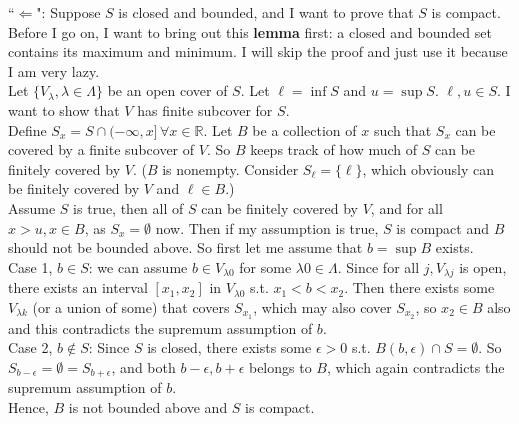 \documentclass[11pt,letterpaper]{article}
\begin{document}
\noindent ``\underline{$\Leftarrow$}": Suppose $S$ is closed and bounded, and I want to prove that $S$ is compact. Before I go on, I want to bring out this \textbf{lemma} first: a closed and bounded set contains its maximum and minimum. I will skip the proof and just use it because I am very lazy.\\
Let $\{V_\lambda, \lambda \in \Lambda\}$ be an open cover of $S$. Let $\ell = \inf S$ and $u = \sup S$. $\ell, u \in S$. I want to show that $V$ has finite subcover for $S$. \\
Define $S_x = S\cap (-\infty, x]\, \forall x \in \mathbb{R}$. Let $B$ be a collection of $x$ such that $S_x$ can be covered by a finite subcover of $V$. So $B$ keeps track of how much of $S$ can be finitely covered by $V$. ($B$ is nonempty. Consider $S_\ell = \{\ell\}$, which obviously can be finitely covered by $V$ and $\ell \in B$.)\\
Assume $S$ is true, then all of $S$ can be finitely covered by $V$, and for all $x > u, x\in B$, as $S_x = \emptyset$ now. Then if my assumption is true, $S$ is compact and $B$ should not be bounded above. So first let me assume that $b = \sup B$ exists. \\
Case 1, $b \in S$: we can assume $b\in V_{\lambda0}$ for some $\lambda0 \in \Lambda$. Since for all $j, V_{\lambda j}$ is open, there exists an interval $[x_1, x_2]$ in $V_{\lambda0}$ s.t. $x_1 < b < x_2$. Then there exists some $V_{\lambda k}$ (or a union of some) that covers $S_{x_1}$, which may also cover $S_{x_2}$, so $x_2 \in B$ also and this contradicts the supremum assumption of $b$.\\
Case 2, $b \notin S$: Since $S$ is closed, there exists some $\epsilon >0$ s.t. $B(b, \epsilon) \cap S = \emptyset$. So $S_{b-\epsilon} = \emptyset = S_{b+\epsilon}$, and both $b-\epsilon, b+\epsilon$ belongs to $B$, which again contradicts the supremum assumption of $b$.\\
Hence, $B$ is not bounded above and $S$ is compact. 

\begin{center}
\end{center}
\end{document}
